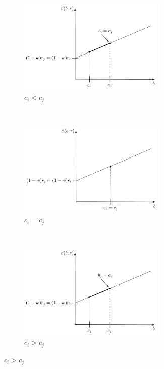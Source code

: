 \begin{figure}[htp]
	\caption{Different bidding scenarios for $r_i = r_j$}
	\vspace{0.5cm}
	\begin{subfigure}[b]{0.5\textwidth}
		\includegraphics[width=2.8in]{2/Figures/complete_N_2_c4}	  
	  \caption{$c_i<c_j$}
	  \label{fig:complete_N_2_c4}
	\end{subfigure}
	\vspace{0.5cm}\\
	\begin{subfigure}[b]{0.5\textwidth}
	  \includegraphics[width=2.8in]{2/Figures/complete_N_2_c5}
	  \caption{$c_i=c_j$}
	  \label{fig:complete_N_2_c5}
	\end{subfigure}
	\vspace{0.5cm}\\
	\begin{subfigure}[b]{0.5\textwidth}
	  \includegraphics[width=2.8in]{2/Figures/complete_N_2_c6}
	  \caption{$c_i > c_j$}
	  \label{fig:complete_N_2_c6}
	\end{subfigure}
	\label{fig:complete_N_2_2}
\end{figure}

